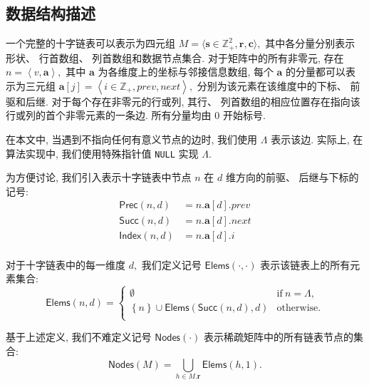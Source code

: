 \subsection{数据结构描述}
\label{sec_data_structure}

一个完整的十字链表可以表示为四元组 $M = \langle \bm{s} \in \mathbb{Z}_{+}^{2}, \bm{r}, \bm{c} \rangle,$ 其中各分量分别表示形状、 行首数组、 列首数组和数据节点集合. 对于矩阵中的所有非零元, 存在 $n = \left\langle v, \bm{a} \right\rangle,$ 其中 $\bm{a}$ 为各维度上的坐标与邻接信息数组, 每个 $\bm{a}$ 的分量都可以表示为三元组 $\bm{a}[j] = \left\langle i \in \mathbb{Z}_+, prev, next\right\rangle,$ 分别为该元素在该维度中的下标、 前驱和后继. 对于每个存在非零元的行或列, 其行、 列首数组的相应位置存在指向该行或列的首个非零元素的一条边. 所有分量均由 0 开始标号.

在本文中, 当遇到不指向任何有意义节点的边时, 我们使用 $\Lambda$ 表示该边. 实际上, 在算法实现中, 我们使用特殊指针值 \texttt{NULL} 实现 $\Lambda.$

\newcommand{\Prec}[2]{\mathsf{Prec}(#1, #2)}
\newcommand{\Succ}[2]{\mathsf{Succ}(#1, #2)}
\newcommand{\Index}[2]{\mathsf{Index}(#1, #2)}
为方便讨论, 我们引入表示十字链表中节点 $n$ 在 $d$ 维方向的前驱、 后继与下标的记号:
\begin{equation}
    \begin{aligned}
        \Prec{n}{d} & = n.\bm{a}[d].prev\\
        \Succ{n}{d} & = n.\bm{a}[d].next\\
        \Index{n}{d} & = n.\bm{a}[d].i\\
    \end{aligned}
\end{equation}

\newcommand{\Elems}[2]{\mathsf{Elems}(#1, #2)}
对于十字链表中的每一维度 $d,$ 我们定义记号 $\Elems{\cdot}{\cdot}$ 表示该链表上的所有元素集合:
\begin{equation}
    \Elems{n}{d} = \begin{cases}
        \emptyset & \text{if}\ n = \Lambda,\\
        \left\{n\right\} \cup \Elems{\Succ{n}{d}}{d} & \text{otherwise}.\\
    \end{cases}
\end{equation}

\newcommand{\Nodes}[1]{\mathsf{Nodes}(#1)}
基于上述定义, 我们不难定义记号 $\Nodes{\cdot}$ 表示稀疏矩阵中的所有链表节点的集合:
\begin{equation}
    \Nodes{M} = \bigcup_{h \in M.\bm{r}} \Elems{h}{1}.
\end{equation}


